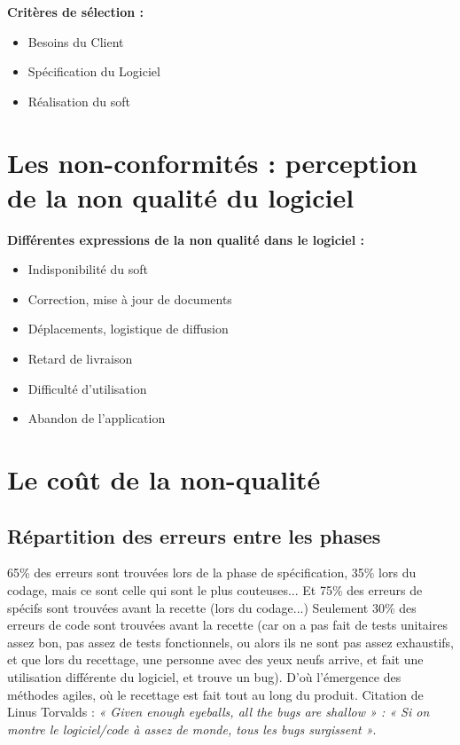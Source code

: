 	\textbf{Critères de sélection  :}\hfill\\
	\begin{itemize}
		\item Besoins du Client
		\item Spécification du Logiciel
		\item Réalisation du soft
	\end{itemize}


\section{Les non-conformités : perception de la non qualité du logiciel}

\textbf{Différentes expressions de la non qualité dans le logiciel :}\hfill\\

\begin{itemize}
    \item Indisponibilité du soft
    \item Correction, mise à jour de documents
    \item Déplacements, logistique de diffusion
    \item Retard de livraison
    \item Difficulté d’utilisation
    \item Abandon de l’application
\end{itemize}




\section{Le coût de la non-qualité}

	\subsection{Répartition des erreurs entre les phases}



65\% des erreurs sont trouvées lors de la phase de spécification, 35\% lors du codage, mais ce sont celle qui sont le plus couteuses...
Et  75\% des erreurs de spécifs sont trouvées avant la recette (lors du codage...)
Seulement 30\% des erreurs de code sont trouvées avant la recette (car on a pas fait de tests unitaires assez bon, pas assez de tests fonctionnels, ou alors ils ne sont pas assez exhaustifs, et que lors du recettage, une personne avec des yeux neufs arrive, et fait une utilisation différente du logiciel, et trouve un bug). D’où l’émergence des méthodes agiles, où le recettage est fait tout au long du produit. Citation de Linus Torvalds : \textit{« Given enough eyeballs, all the bugs are shallow » : « Si on montre le logiciel/code à assez de monde, tous les bugs surgissent »}.


